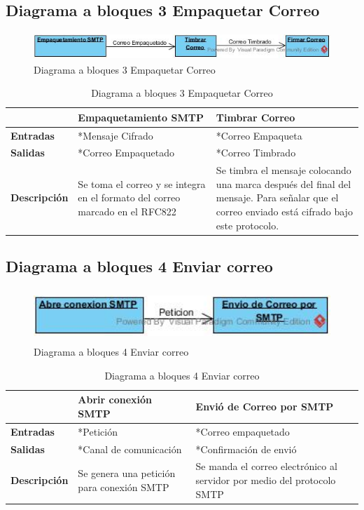 \subsection{Diagrama a bloques 3 Empaquetar Correo}
\begin{figure}[H]
	\includegraphics[width=1\linewidth, height=1cm]{./images/bloques3.jpg}
	\caption{Diagrama a bloques 3 Empaquetar Correo}
	\label{fig:5-3-1}
\end{figure}

\begin{table}[H]
 \centering
   {
     \begin{tabular}{| p{4cm} | p{4cm} | p{4cm} |}
     \hline
     & \textbf{Empaquetamiento SMTP} & \textbf{Timbrar Correo}\\
     \hline
     \textbf{Entradas} & *Mensaje Cifrado & *Correo Empaqueta\\
     \hline
     \textbf{Salidas} & *Correo Empaquetado & *Correo Timbrado\\
     \hline
     \textbf{Descripción} & Se toma el correo y se integra en el formato del correo marcado en el RFC822 & Se timbra el mensaje colocando una marca después del final del mensaje. Para señalar que el correo enviado está cifrado bajo este protocolo.\\
	\hline
    \end{tabular}
    }
    \caption{Diagrama a bloques 3 Empaquetar Correo}
    \label{tabla:b3}
\end{table}
\subsection{Diagrama a bloques 4 Enviar correo}
\begin{figure}[H]
	\includegraphics[width=1\linewidth, height=2cm]{./images/bloques4.jpg}
	\caption{Diagrama a bloques 4 Enviar correo}
	\label{fig:5-4-1}
\end{figure}

\begin{table}[H]
 \centering
   {
     \begin{tabular}{| p{4cm} | p{4cm} | p{4cm} |}
     \hline
     & \textbf{Abrir conexión SMTP} & \textbf{Envió de Correo por SMTP}\\
     \hline
     \textbf{Entradas} & *Petición & *Correo empaquetado\\
     \hline
     \textbf{Salidas} & *Canal de comunicación & *Confirmación de envió\\
     \hline
     \textbf{Descripción} & Se genera una petición para conexión SMTP  & Se manda el correo electrónico al servidor por medio del protocolo SMTP\\
	\hline
    \end{tabular}
    }
    \caption{Diagrama a bloques 4 Enviar correo}
    \label{tabla:b4}
\end{table}
\clearpage
